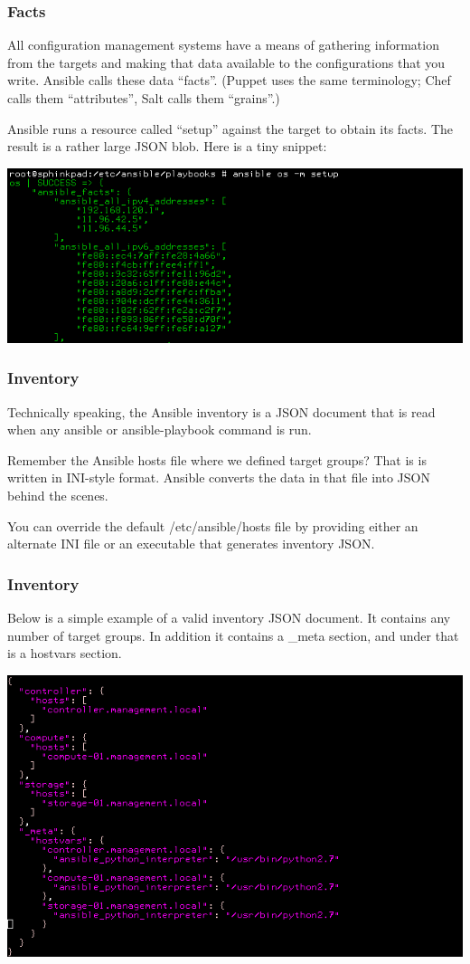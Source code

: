 \documentclass[helvetica,english,utf8,notitle,nologo]{beamer}
\begin{document}
\begin{frame}
  \frametitle{Facts}

  All configuration management systems have a means of gathering
  information from the targets and making that data available to the
  configurations that you write. Ansible calls these data
  ``facts''. (Puppet uses the same terminology; Chef calls them
  ``attributes'', Salt calls them ``grains''.)

  Ansible runs a resource called ``setup'' against the target to
  obtain its facts. The result is a rather large JSON blob. Here is a
  tiny snippet:

  \includegraphics[scale=0.44]{img_8}
\end{frame}

\begin{frame}
  \frametitle{Inventory}

  Technically speaking, the Ansible inventory is a JSON document that
  is read when any ansible or ansible-playbook command is run.

  Remember the Ansible hosts file where we defined target groups? That
  is is written in INI-style format. Ansible converts the data in that
  file into JSON behind the scenes.

  You can override the default /etc/ansible/hosts file by providing
  either an alternate INI file or an executable that generates
  inventory JSON.
\end{frame}

\begin{frame}
  \frametitle{Inventory}

  Below is a simple example of a valid inventory JSON document. It
  contains any number of target groups. In addition it contains a
  \_meta section, and under that is a hostvars section.

  \includegraphics[scale=0.44]{img_9}
\end{frame}
\end{document}
